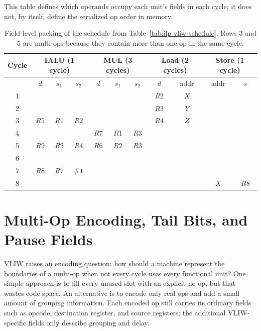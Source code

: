 This table defines which operands occupy each unit's fields in each cycle; it does not, by itself, define the serialized op order in memory.
\begin{table}[t]
    \centering
    \small
    \setlength{\tabcolsep}{4pt}
    \renewcommand{\arraystretch}{1.12}
    \begin{tabular}{|c|c c c|c c c|c c|c c|}
        \hline
        Cycle & \multicolumn{3}{c|}{IALU (1 cycle)} & \multicolumn{3}{c|}{MUL (3 cycles)} & \multicolumn{2}{c|}{Load (2 cycles)} & \multicolumn{2}{c|}{Store (1 cycle)} \\
        \hline
        & $d$  & $s_1$ & $s_2$ & $d$  & $s_1$ & $s_2$ & $d$  & addr & addr & $s$  \\
        \hline
        1 &      &       &       &      &       &       & $R2$ & $X$  &      &      \\
        \hline
        2 &      &       &       &      &       &       & $R3$ & $Y$  &      &      \\
        \hline
        3 & $R5$ & $R1$  & $R2$  &      &       &       & $R4$ & $Z$  &      &      \\
        \hline
        4 &      &       &       & $R7$ & $R1$  & $R3$  &      &      &      &      \\
        \hline
        5 & $R9$ & $R2$  & $R4$  & $R6$ & $R2$  & $R3$  &      &      &      &      \\
        \hline
        6 &      &       &       &      &       &       &      &      &      &      \\
        \hline
        7 & $R8$ & $R7$  & $\#1$ &      &       &       &      &      &      &      \\
        \hline
        8 &      &       &       &      &       &       &      &      & $X$  & $R8$ \\
        \hline
    \end{tabular}
    \caption{Field-level packing of the schedule from Table~\ref{tab:ilp-vliw-schedule}. Rows 3 and 5 are multi-ops because they contain more than one op in the same cycle.}
    \label{tab:ilp-vliw-packed-schedule}
\end{table}


\section{Multi-Op Encoding, Tail Bits, and Pause Fields}\label{sec:ilp-vliw-encoding}
VLIW raises an encoding question: how should a machine represent the boundaries of a multi-op when not every cycle uses every functional unit?
One simple approach is to fill every unused slot with an explicit no-op, but that wastes code space.
An alternative is to encode only real ops and add a small amount of grouping information.
Each encoded op still carries its ordinary fields such as opcode, destination register, and source registers; the additional VLIW-specific fields only describe grouping and delay.

